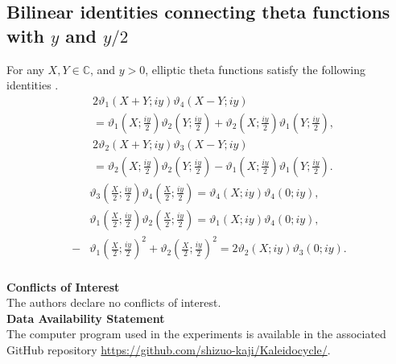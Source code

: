 \documentclass[10pt,leqno]{amsart}
\numberwithin{equation}{section}
\begin{document}
\subsection{Bilinear identities connecting theta functions with \texorpdfstring{$y$}{y} and \texorpdfstring{$y/2$}{y/2}}
 For any $X, Y\in\mathbb{C}$, and $y>0$, elliptic theta functions satisfy the following identities \cite{Mumford:Tata_I,Khachev_Zabrodin:theta}.
\begin{align}
&2\vartheta_{1}\left(X+Y; iy\right)\vartheta_{4}\left(X-Y; iy\right)\nonumber\\
&=\vartheta_{1}\left(X; \frac{iy}{2}\right)\vartheta_{2}\left(Y; \frac{iy}{2}\right)+\vartheta_{2}\left(X; \frac{iy}{2}\right)\vartheta_{1}\left(Y; \frac{iy}{2}\right),\label{kappa-5}\\
&2\vartheta_{2}\left(X+Y; iy\right)\vartheta_{3}\left(X-Y; iy\right)\nonumber\\
&=\vartheta_{2}\left(X; \frac{iy}{2}\right)\vartheta_{2}\left(Y; \frac{iy}{2}\right)-\vartheta_{1}\left(X; \frac{iy}{2}\right)\vartheta_{1}\left(Y; \frac{iy}{2}\right).\label{kappa-6}
\end{align}
  \begin{equation}\label{id:modular2}
 \begin{split}
& \vartheta_{3}\left(\frac{X}{2}; \frac{iy}{2}\right)\vartheta_{4}\left(\frac{X}{2}; \frac{iy}{2}\right)=\vartheta_{4}\left(X; iy\right)\vartheta_{4}\left(0; iy\right),\\
& \vartheta_{1}\left(\frac{X}{2}; \frac{iy}{2}\right)\vartheta_{2}\left(\frac{X}{2}; \frac{iy}{2}\right)=\vartheta_{1}\left(X; iy\right)\vartheta_{4}\left(0; iy\right),\\
 -&\vartheta_{1}\left(\frac{X}{2}; \frac{iy}{2}\right)^{2}+\vartheta_{2}\left(\frac{X}{2}; \frac{iy}{2}\right)^{2}=2\vartheta_{2}\left(X; iy\right)\vartheta_{3}\left(0; iy\right).\\
  \end{split}
 \end{equation}


\noindent
\textbf{Conflicts of Interest}\\
The authors declare no conflicts of interest.\\
\textbf{Data Availability Statement}\\
The computer program used in the experiments is available in the associated GitHub repository \url{https://github.com/shizuo-kaji/Kaleidocycle/}.



                                   
\end{document}
